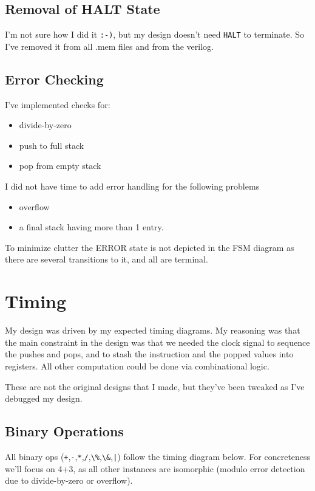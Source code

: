 \documentclass{article}
\begin{document}
\subsection{Removal of HALT State}

I'm not sure how I did it \verb':-)',
but my design doesn't need \verb'HALT' to terminate.
So I've removed it from all .mem files and from the
verilog.

\subsection{Error Checking}
I've implemented checks for:
\begin{itemize}[noitemsep]
\item divide-by-zero
\item push to full stack
\item pop from empty stack
\end{itemize}

I did not have time to add error handling for the following problems
\begin{itemize}[noitemsep]
\item overflow
\item a final stack having more than 1 entry.
\end{itemize}

To minimize clutter the ERROR state is not depicted in the FSM diagram as there are several transitions to it,
and all are terminal.
\section{Timing}
My design was driven by my expected timing diagrams.
My reasoning was that the main constraint in the
design was that we needed the clock signal to sequence
the pushes and pops, and to stash the instruction
and the popped values into registers.
All other computation could be done via combinational
logic.

These are not the original designs that I made, but
they've been tweaked as I've debugged my design.

\subsection{Binary Operations}

All binary ops (\verb'+',\verb'-',\verb'*',\verb'/',\verb'\%',\verb'\&',\verb'|') follow the timing diagram below.
For concreteness we'll focus on 4+3, as all other instances
are isomorphic (modulo error detection due to divide-by-zero or overflow).
\end{document}
